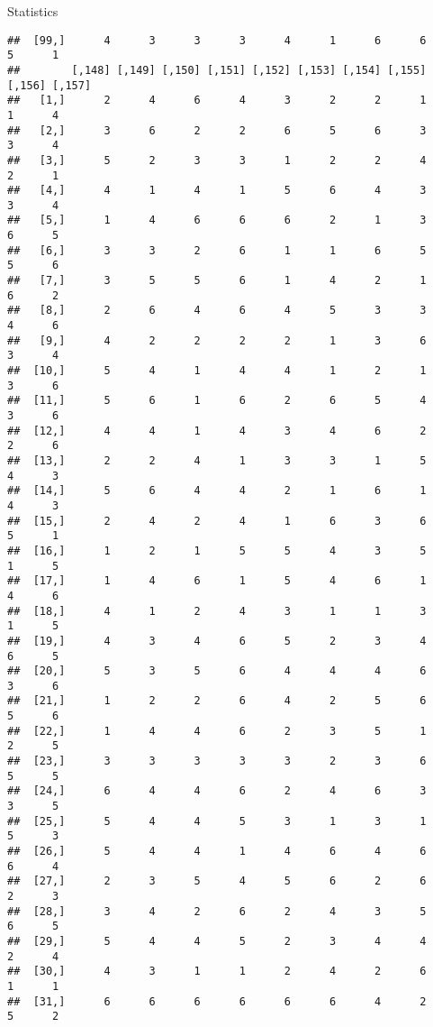 \documentclass[
  ignorenonframetext,
]{beamer}
\begin{document}
\begin{frame}[fragile]{Statistics}
\begin{verbatim}
##  [99,]      4      3      3      3      4      1      6      6      5      1
##        [,148] [,149] [,150] [,151] [,152] [,153] [,154] [,155] [,156] [,157]
##   [1,]      2      4      6      4      3      2      2      1      1      4
##   [2,]      3      6      2      2      6      5      6      3      3      4
##   [3,]      5      2      3      3      1      2      2      4      2      1
##   [4,]      4      1      4      1      5      6      4      3      3      4
##   [5,]      1      4      6      6      6      2      1      3      6      5
##   [6,]      3      3      2      6      1      1      6      5      5      6
##   [7,]      3      5      5      6      1      4      2      1      6      2
##   [8,]      2      6      4      6      4      5      3      3      4      6
##   [9,]      4      2      2      2      2      1      3      6      3      4
##  [10,]      5      4      1      4      4      1      2      1      3      6
##  [11,]      5      6      1      6      2      6      5      4      3      6
##  [12,]      4      4      1      4      3      4      6      2      2      6
##  [13,]      2      2      4      1      3      3      1      5      4      3
##  [14,]      5      6      4      4      2      1      6      1      4      3
##  [15,]      2      4      2      4      1      6      3      6      5      1
##  [16,]      1      2      1      5      5      4      3      5      1      5
##  [17,]      1      4      6      1      5      4      6      1      4      6
##  [18,]      4      1      2      4      3      1      1      3      1      5
##  [19,]      4      3      4      6      5      2      3      4      6      5
##  [20,]      5      3      5      6      4      4      4      6      3      6
##  [21,]      1      2      2      6      4      2      5      6      5      6
##  [22,]      1      4      4      6      2      3      5      1      2      5
##  [23,]      3      3      3      3      3      2      3      6      5      5
##  [24,]      6      4      4      6      2      4      6      3      3      5
##  [25,]      5      4      4      5      3      1      3      1      5      3
##  [26,]      5      4      4      1      4      6      4      6      6      4
##  [27,]      2      3      5      4      5      6      2      6      2      3
##  [28,]      3      4      2      6      2      4      3      5      6      5
##  [29,]      5      4      4      5      2      3      4      4      2      4
##  [30,]      4      3      1      1      2      4      2      6      1      1
##  [31,]      6      6      6      6      6      6      4      2      5      2

\end{verbatim}
\end{frame}
\end{document}
